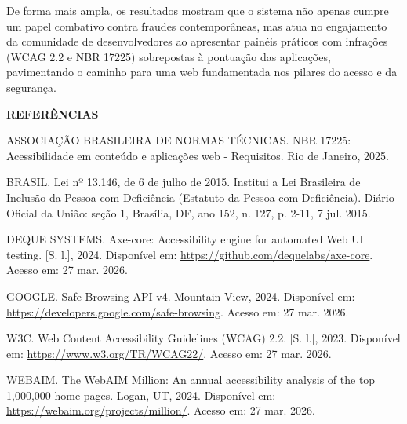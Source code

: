 \documentclass[12pt, a4paper]{article}
\begin{document}
De forma mais ampla, os resultados mostram que o sistema não apenas cumpre um papel combativo contra fraudes contemporâneas, mas atua no engajamento da comunidade de desenvolvedores ao apresentar painéis práticos com infrações (WCAG 2.2 e NBR 17225) sobrepostas à pontuação das aplicações, pavimentando o caminho para uma web fundamentada nos pilares do acesso e da segurança.

\begin{center}
    \vspace{1.5em}
    \textbf{REFERÊNCIAS}
    \vspace{1em}
\end{center}

\begin{singlespace}
\noindent ASSOCIAÇÃO BRASILEIRA DE NORMAS TÉCNICAS. NBR 17225: Acessibilidade em conteúdo e aplicações web - Requisitos. Rio de Janeiro, 2025.

\vspace{1em}
\noindent BRASIL. Lei nº 13.146, de 6 de julho de 2015. Institui a Lei Brasileira de Inclusão da Pessoa com Deficiência (Estatuto da Pessoa com Deficiência). Diário Oficial da União: seção 1, Brasília, DF, ano 152, n. 127, p. 2-11, 7 jul. 2015.

\vspace{1em}
\noindent DEQUE SYSTEMS. Axe-core: Accessibility engine for automated Web UI testing. [S. l.], 2024. Disponível em: \url{https://github.com/dequelabs/axe-core}. Acesso em: 27 mar. 2026.

\vspace{1em}
\noindent GOOGLE. Safe Browsing API v4. Mountain View, 2024. Disponível em: \url{https://developers.google.com/safe-browsing}. Acesso em: 27 mar. 2026.

\vspace{1em}
\noindent W3C. Web Content Accessibility Guidelines (WCAG) 2.2. [S. l.], 2023. Disponível em: \url{https://www.w3.org/TR/WCAG22/}. Acesso em: 27 mar. 2026.

\vspace{1em}
\noindent WEBAIM. The WebAIM Million: An annual accessibility analysis of the top 1,000,000 home pages. Logan, UT, 2024. Disponível em: \url{https://webaim.org/projects/million/}. Acesso em: 27 mar. 2026.
\end{singlespace}
\end{document}
